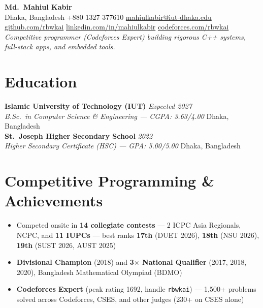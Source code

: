 \documentclass[10.5pt,letterpaper]{article}
\newcommand{\entry}[4]{%
  \textbf{#1} \hfill \textit{#2}\\
  \textit{\color{subtext}#3} \hfill #4\\[1pt]
}
\newcommand{\link}[2]{\href{#1}{\textcolor{accent}{#2}}}
\begin{document}
\begin{center}
  {\LARGE \bfseries Md.\ Mahiul Kabir}\\[2pt]
  \small
  Dhaka, Bangladesh \;\textbar\; +880 1327 377610 \;\textbar\;
  \link{mailto:mahiulkabir@iut-dhaka.edu}{mahiulkabir@iut-dhaka.edu}\\
  \link{https://github.com/rbwkai}{github.com/rbwkai} \;\textbar\;
  \link{https://linkedin.com/in/mahiulkabir}{linkedin.com/in/mahiulkabir} \;\textbar\;
  \link{https://codeforces.com/profile/rbwkai}{codeforces.com/rbwkai}\\[3pt]
  {\small\itshape\color{subtext}
  Competitive programmer (Codeforces Expert) building rigorous C++ systems, full-stack apps, and embedded tools.}
\end{center}

\section{Education}

\entry{Islamic University of Technology (IUT)}{Expected 2027}
{B.Sc.\ in Computer Science \& Engineering --- CGPA: 3.63/4.00}{Dhaka, Bangladesh}

\entry{St.\ Joseph Higher Secondary School}{2022}
{Higher Secondary Certificate (HSC) --- GPA: 5.00/5.00}{Dhaka, Bangladesh}

\section{Competitive Programming \& Achievements}
\begin{itemize}
  \item Competed onsite in \textbf{14 collegiate contests} --- 2 ICPC Asia Regionals, NCPC, and \textbf{11 IUPCs} --- best ranks \textbf{17th} (DUET 2026), \textbf{18th} (NSU 2026), \textbf{19th} (SUST 2026, AUST 2025)
  \item \textbf{Divisional Champion} (2018) and \textbf{3$\times$ National Qualifier} (2017, 2018, 2020), Bangladesh Mathematical Olympiad (BDMO)
  \item \textbf{Codeforces Expert} (peak rating 1692, handle \texttt{rbwkai}) --- 1,500+ problems solved across Codeforces, CSES, and other judges (230+ on CSES alone)
\end{itemize}
\end{document}
